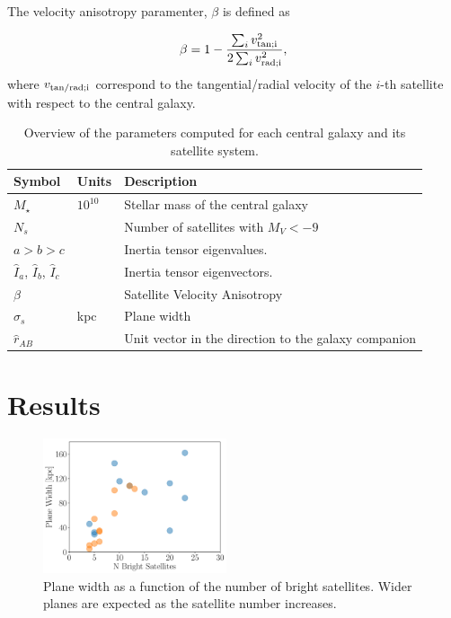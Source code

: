 \documentclass[a4paper,fleqn,usenatbib]{mnras}
\newcommand{\Msun}{{\ifmmode{{\rm{M_{\odot}}}}\else{${\rm{M_{\odot}}}$}\fi}}
\begin{document}
The velocity anisotropy paramenter, $\beta$ is defined as

\begin{equation}
  \beta = 1 - \frac{\sum_i v^2_{\rm{tan}; i}}{2\sum_i v^{2}_{\rm{rad};i}},
\label{eq:beta}
\end{equation}
% 
where $v_{\rm{tan/rad};i}$ correspond to the tangential/radial
velocity of the $i$-th satellite with respect to the central galaxy.



\begin{table}
  \centering
\begin{tabular}{lll}
\hline\hline
Symbol & Units & Description\\\hline
$M_{\star}$ & $10^{10}$\Msun & Stellar mass of the central galaxy\\
$N_s$ & & Number of satellites with $M_V<-9$\\
$a > b> c$ & & Inertia tensor eigenvalues. \\
$\hat{I}_a$, $\hat{I}_b$, $\hat{I}_c$ & & Inertia tensor eigenvectors. \\
$\beta$  &  & Satellite Velocity Anisotropy\\
$\sigma_s$ & kpc & Plane width\\
$\hat{r}_{AB}$& & Unit vector in the direction to the galaxy companion\\
\hline\hline
\end{tabular}
  \caption{Overview of the parameters computed for each central galaxy
    and its satellite system.
  \label{tab:models}}
\end{table}


\section{Results}
\label{sec:results}

\begin{figure}
\centering
\includegraphics[width=0.48\textwidth]{planes.pdf}
\caption{
Plane width as a function of the number of bright satellites.
Wider planes are expected as the satellite number increases.
\label{fig:planes}}
\end{figure}
\end{document}
